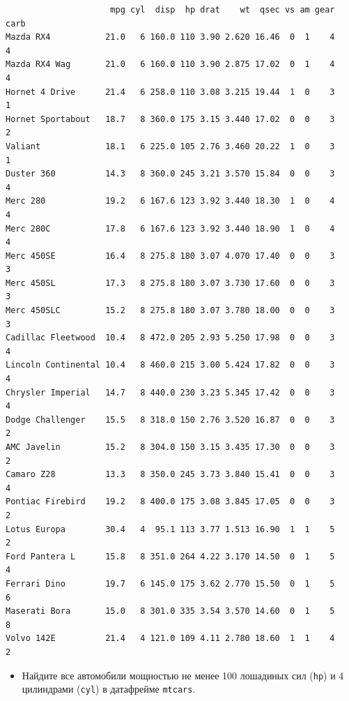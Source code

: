 \documentclass[
]{book}
\newenvironment{Shaded}{\begin{snugshade}}{\end{snugshade}}
\newcommand{\DecValTok}[1]{\textcolor[rgb]{0.00,0.00,0.81}{#1}}
\newcommand{\NormalTok}[1]{#1}
\newcommand{\OperatorTok}[1]{\textcolor[rgb]{0.81,0.36,0.00}{\textbf{#1}}}
\newcommand{\StringTok}[1]{\textcolor[rgb]{0.31,0.60,0.02}{#1}}
\providecommand{\tightlist}{%
  \setlength{\itemsep}{0pt}\setlength{\parskip}{0pt}}
\begin{document}
\begin{verbatim}
                     mpg cyl  disp  hp drat    wt  qsec vs am gear carb
Mazda RX4           21.0   6 160.0 110 3.90 2.620 16.46  0  1    4    4
Mazda RX4 Wag       21.0   6 160.0 110 3.90 2.875 17.02  0  1    4    4
Hornet 4 Drive      21.4   6 258.0 110 3.08 3.215 19.44  1  0    3    1
Hornet Sportabout   18.7   8 360.0 175 3.15 3.440 17.02  0  0    3    2
Valiant             18.1   6 225.0 105 2.76 3.460 20.22  1  0    3    1
Duster 360          14.3   8 360.0 245 3.21 3.570 15.84  0  0    3    4
Merc 280            19.2   6 167.6 123 3.92 3.440 18.30  1  0    4    4
Merc 280C           17.8   6 167.6 123 3.92 3.440 18.90  1  0    4    4
Merc 450SE          16.4   8 275.8 180 3.07 4.070 17.40  0  0    3    3
Merc 450SL          17.3   8 275.8 180 3.07 3.730 17.60  0  0    3    3
Merc 450SLC         15.2   8 275.8 180 3.07 3.780 18.00  0  0    3    3
Cadillac Fleetwood  10.4   8 472.0 205 2.93 5.250 17.98  0  0    3    4
Lincoln Continental 10.4   8 460.0 215 3.00 5.424 17.82  0  0    3    4
Chrysler Imperial   14.7   8 440.0 230 3.23 5.345 17.42  0  0    3    4
Dodge Challenger    15.5   8 318.0 150 2.76 3.520 16.87  0  0    3    2
AMC Javelin         15.2   8 304.0 150 3.15 3.435 17.30  0  0    3    2
Camaro Z28          13.3   8 350.0 245 3.73 3.840 15.41  0  0    3    4
Pontiac Firebird    19.2   8 400.0 175 3.08 3.845 17.05  0  0    3    2
Lotus Europa        30.4   4  95.1 113 3.77 1.513 16.90  1  1    5    2
Ford Pantera L      15.8   8 351.0 264 4.22 3.170 14.50  0  1    5    4
Ferrari Dino        19.7   6 145.0 175 3.62 2.770 15.50  0  1    5    6
Maserati Bora       15.0   8 301.0 335 3.54 3.570 14.60  0  1    5    8
Volvo 142E          21.4   4 121.0 109 4.11 2.780 18.60  1  1    4    2
\end{verbatim}

\begin{itemize}
\tightlist
\item
  Найдите все автомобили мощностью не менее 100 лошадиных сил (\texttt{hp}) и 4 цилиндрами (\texttt{cyl}) в датафрейме \texttt{mtcars}.
\end{itemize}

\begin{Shaded}
\end{Shaded}
\end{document}

